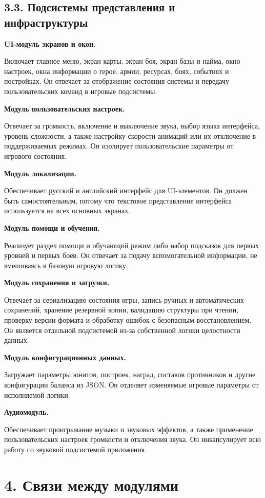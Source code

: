 \documentclass[12pt,a4paper]{article}
\begin{document}
\subsection*{3.3. Подсистемы представления и инфраструктуры}

\textbf{UI-модуль экранов и окон.}

Включает главное меню, экран карты, экран боя, экран базы и найма, окно настроек, окна информации о герое, армии, ресурсах, боях, событиях и постройках. Он отвечает за отображение состояния системы и передачу пользовательских команд в игровые подсистемы.

\textbf{Модуль пользовательских настроек.}

Отвечает за громкость, включение и выключение звука, выбор языка интерфейса, уровень сложности, а также настройку скорости анимаций или их отключение в поддерживаемых режимах. Он изолирует пользовательские параметры от игрового состояния.

\textbf{Модуль локализации.}

Обеспечивает русский и английский интерфейс для UI-элементов. Он должен быть самостоятельным, потому что текстовое представление интерфейса используется на всех основных экранах.

\textbf{Модуль помощи и обучения.}

Реализует раздел помощи и обучающий режим либо набор подсказок для первых уровней и первых боёв. Он отвечает за подачу вспомогательной информации, не вмешиваясь в базовую игровую логику.

\textbf{Модуль сохранения и загрузки.}

Отвечает за сериализацию состояния игры, запись ручных и автоматических сохранений, хранение резервной копии, валидацию структуры при чтении, проверку версии формата и обработку ошибок с безопасным восстановлением. Он является отдельной подсистемой из-за собственной логики целостности данных.

\textbf{Модуль конфигурационных данных.}

Загружает параметры юнитов, построек, наград, составов противников и другие конфигурации баланса из JSON. Он отделяет изменяемые игровые параметры от исполняемой логики.

\textbf{Аудиомодуль.}

Обеспечивает проигрывание музыки и звуковых эффектов, а также применение пользовательских настроек громкости и отключения звука. Он инкапсулирует всю работу со звуковой подсистемой приложения.

\section*{4. Связи между модулями}
\end{document}
